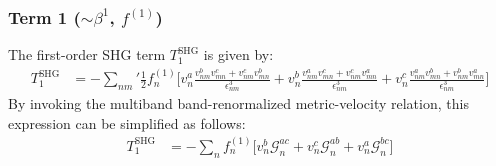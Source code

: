 \documentclass[twocolumn, prx, reprint, amsfonts, amsmath, amssymb, longbibliography, floatfix, aps]{revtex4-2}
\begin{document}
\subsubsection*{Term 1 (\texorpdfstring{$\sim \beta^1$}{beta1}, \texorpdfstring{$f^{(1)}$}{f1})}
The first-order SHG term $T^{\text{SHG}}_1$ is given by:
\begin{equation}
	\begin{aligned}
		T^{\text{SHG}}_1 &= - {\textstyle \sum_{nm}'}\frac{1}{2} f^{(1)}_n \Big[v^a_{n} \frac{v^b_{nm}v^c_{mn} + v^c_{nm}v^b_{mn}}{\epsilon_{nm}^3} + v^b_{n} \frac{v^a_{nm}v^c_{mn} + v^c_{nm}v^a_{mn}}{\epsilon_{nm}^3}  + v^c_{n} \frac{v^a_{nm}v^b_{mn} + v^b_{nm}v^a_{mn}}{\epsilon_{nm}^3} \Big] 
	\end{aligned}
\end{equation}
By invoking the multiband band-renormalized metric-velocity relation, this expression can be simplified as follows:
\begin{equation}
	\begin{aligned}
		T^{\text{SHG}}_1
		&= - {\textstyle \sum_{n}} f^{(1)}_n \Big[v^b_{n} \mathcal{G}^{ac}_{n}  + v^c_{n} \mathcal{G}^{ab}_{n} + v^a_{n} \mathcal{G}^{bc}_{n} \Big]
	\end{aligned}
\end{equation}
\end{document}
